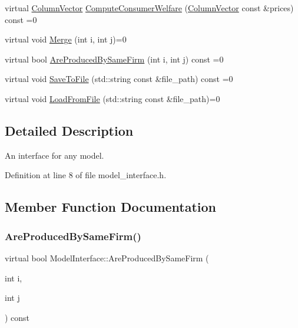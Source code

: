 \begin{DoxyCompactItemize}
\item 
virtual \hyperlink{classColumnVector}{Column\+Vector} \hyperlink{classModelInterface_a094ebb85618fb13bf38f6faff1f5dd7b}{Compute\+Consumer\+Welfare} (\hyperlink{classColumnVector}{Column\+Vector} const \&prices) const =0
\item 
virtual void \hyperlink{classModelInterface_a9aa52643da1fe9e74750e31a6c6ec469}{Merge} (int i, int j)=0
\item 
virtual bool \hyperlink{classModelInterface_abbc3c44c6d41b596b6201a9e61e1ff83}{Are\+Produced\+By\+Same\+Firm} (int i, int j) const =0
\item 
virtual void \hyperlink{classModelInterface_ab5709db8ecb96fd9efd02f4777d5502a}{Save\+To\+File} (std\+::string const \&file\+\_\+path) const =0
\item 
virtual void \hyperlink{classModelInterface_a7f408fdb15c10ce8cabf6b942bbc9c38}{Load\+From\+File} (std\+::string const \&file\+\_\+path)=0
\end{DoxyCompactItemize}


\subsection{Detailed Description}
An interface for any model. 

Definition at line 8 of file model\+\_\+interface.\+h.



\subsection{Member Function Documentation}
\mbox{\label{classModelInterface_abbc3c44c6d41b596b6201a9e61e1ff83}} 
\subsubsection{\texorpdfstring{Are\+Produced\+By\+Same\+Firm()}{AreProducedBySameFirm()}}
{\footnotesize\ttfamily virtual bool Model\+Interface\+::\+Are\+Produced\+By\+Same\+Firm (\begin{DoxyParamCaption}\item[{int}]{i,  }\item[{int}]{j }\end{DoxyParamCaption}) const\hspace{0.3cm}{\ttfamily [pure virtual]}}

